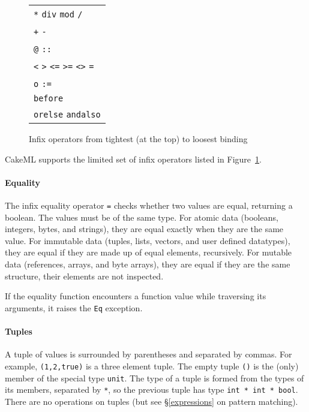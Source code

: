 \documentclass[12pt,a4paper]{book}
\begin{document}
\begin{figure}
\centering
\begin{tabular}{l}
 \texttt{*} \texttt{div} \texttt{mod} \texttt{/}\\
 \texttt{+} \texttt{-}\\
 \texttt{@} \texttt{::}\\
 \texttt{<} \texttt{>} \texttt{<=} \texttt{>=} \texttt{<>} \texttt{=}\\
 \texttt{o} \texttt{:=}\\
 \texttt{before}\\
 \texttt{orelse} \texttt{andalso}
 \end{tabular}
\caption{Infix operators from tightest (at the top) to loosest binding}
\label{precedences}
\end{figure}

CakeML supports the limited set of infix operators listed in Figure~\ref{precedences}.

\paragraph{Equality}

The infix equality operator \texttt{=} checks whether two values are equal, returning a boolean. The values must be of the same type. For atomic data (booleans, integers, bytes, and strings), they are equal exactly when they are the same value. For immutable data (tuples, lists, vectors, and user defined datatypes), they are equal if they are made up of equal elements, recursively. For mutable data (references, arrays, and byte arrays), they are equal if they are the same structure, their elements are not inspected.

If the equality function encounters a function value while traversing its arguments, it raises the \texttt{Eq} exception.

\paragraph{Tuples} A tuple of values is surrounded by parentheses and separated by commas. For example, \texttt{(1,2,true)} is a three element tuple. The empty tuple \texttt{()} is the (only) member of the special type \texttt{unit}. The type of a tuple is formed from the types of its members, separated by \texttt{*}, so the previous tuple has type \texttt{int * int * bool}. There are no operations on tuples (but see \S\ref{expressions} on pattern matching).
\end{document}
